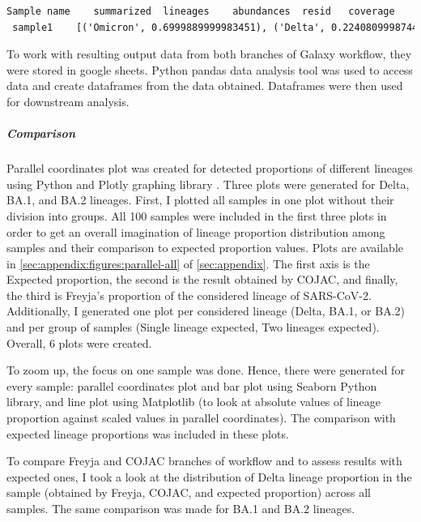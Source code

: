                 \begin{lstlisting}[language=xml, caption=Freyja output for sample 1 from mock dataset, label=list:methods:freyja-s1]
 Sample name	summarized	lineages	abundances	resid	coverage
 sample1 	[('Omicron', 0.6999889999983451), ('Delta', 0.22408099987442534), ('Other', 0.07552100018490182)]	BA.1.18 AY.4 BA.1.19 BA.1.1.13 BA.1.15.1 AY.38 BA.1.9 BA.1.16 B B.1.617.2 B.1.1.529 XS	0.23943700 0.11764700 0.11363600 0.10000000 0.09667000 0.06944400 0.06686400 0.06474800 0.06122400 0.03699000 0.01863400 0.01429700	7.611495978	99.95971667
                \end{lstlisting}
                
                To work with resulting output data from both branches of Galaxy workflow, they were stored in google sheets. Python pandas data analysis tool \cite{pandas2022} was used to access data and create dataframes from the data obtained. Dataframes were then used for downstream analysis.

                \subparagraph{Comparison}
                Parallel coordinates plot was created for detected proportions of different lineages using Python and Plotly graphing library \cite{plotly}. Three plots were generated for Delta, BA.1, and BA.2 lineages. First, I plotted all samples in one plot without their division into groups. All 100 samples were included in the first three plots in order to get an overall imagination of lineage proportion distribution among samples and their comparison to expected proportion values. Plots are available in \autoref{sec:appendix:figures:parallel-all} of \cref{sec:appendix}. The first axis is the Expected proportion, the second is the result obtained by COJAC, and finally, the third is Freyja’s proportion of the considered lineage of SARS-CoV-2. Additionally, I generated one plot per considered lineage (Delta, BA.1, or BA.2) and per group of samples (Single lineage expected, Two lineages expected). Overall, 6 plots were created. 

                To zoom up, the focus on one sample was done. Hence, there were generated for every sample: parallel coordinates plot and bar plot using Seaborn Python library, and line plot using Matplotlib (to look at absolute values of lineage proportion against scaled values in parallel coordinates). The comparison with expected lineage proportions was included in these plots.
                
                To compare Freyja and COJAC branches of workflow and to assess results with expected ones, I took a look at the distribution of Delta lineage proportion in the sample (obtained by Freyja, COJAC, and expected proportion) across all samples. The same comparison was made for BA.1 and BA.2 lineages.
                
